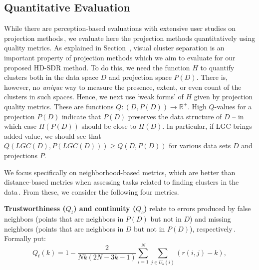 \documentclass[sagev,Afour,times]{sagej}
\begin{document}
\subsection{Quantitative Evaluation}
\label{sec:qualityEval}
%
While there are perception-based evaluations with extensive user studies on projection methods\,\cite{perceptionEvalDR_userstudy1}, we evaluate here the projection methods quantitatively using quality metrics. As explained in Section~, visual cluster separation is an important property of projection methods which we aim to evaluate for our proposed HD-SDR method. To do this, we need the function $H$ to quantify clusters both in the data space $D$ and projection space $P(D)$. There is, however, no \emph{unique} way to measure the presence, extent, or even count of the clusters in such spaces. Hence, we next use `weak forms' of $H$ given by projection quality metrics. These are functions $Q : (D,P(D)) \rightarrow \mathbb{R}^{+}$. High $Q$-values for a projection $P(D)$ indicate that $P(D)$ preserves the data structure of $D$ -- in which case $H(P(D))$ should be close to $H(D)$. In particular, if LGC brings added value, we should see that $Q(LGC(D),P(LGC(D))) \geq Q(D,P(D))$ for various data sets $D$ and projections $P$.

We focus specifically on neighborhood-based metrics, which are better than distance-based metrics when assessing tasks related to finding clusters in the data\,\cite{jaccard_martins2015,mateusDR_survey2019}. From these, we consider the following four metrics.

\noindent\textbf{Trustworthiness ($Q_t$) and continuity ($Q_c$)} relate to errors produced by false
neighbors (points that are neighbors in $P(D)$ but not in $D$) and missing neighbors (points that are neighbors in $D$ but not in $P(D)$), respectively\,\cite{trustworthiness_orig}. Formally put:
\begin{equation}
    \label{Eq3}
    	Q_t(k) = 1-\frac{2}{N k(2N-3 k-1)} \sum_{i=1}^{N} \sum_{j \in U_{k} (i)} (r(i,j)-k),
\end{equation}
\end{document}
